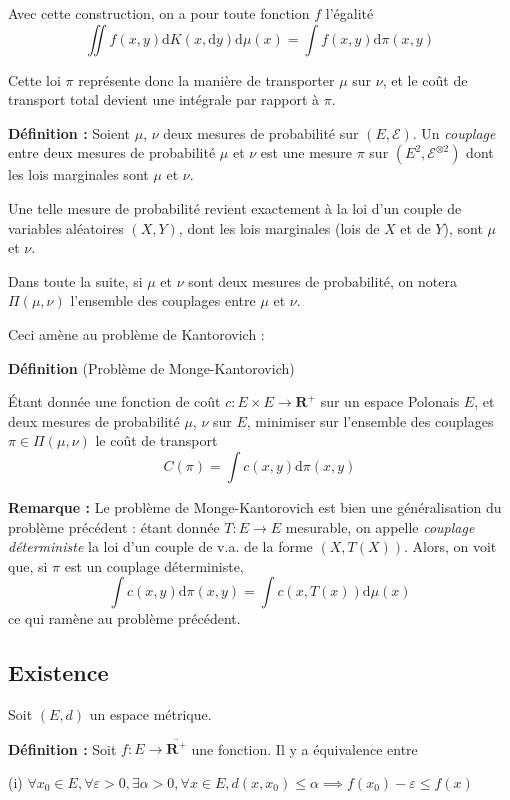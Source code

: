 \documentclass[12pt]{article}
\begin{document}
Avec cette construction, on a pour toute fonction $f$ l'égalité $$ \iint f(x,y) \mathrm d K(x,\mathrm d y) \mathrm d \mu(x) = \int f(x,y) \mathrm d \pi(x,y) $$

Cette loi $ \pi $ représente donc la manière de transporter $ \mu $ sur $\nu$, et le coût de transport total devient une intégrale par rapport à $ \pi $.

\textbf{Définition :} Soient $\mu$, $\nu$ deux mesures de probabilité sur $(E, \mathcal E)$. Un \textit{couplage} entre deux mesures de probabilité $ \mu $ et $ \nu $ est une mesure $ \pi $ sur $ (E^2, \mathcal E^{\otimes 2}) $ dont les lois marginales sont $\mu$ et $\nu$. 

Une telle mesure de probabilité revient exactement à la loi d'un couple de variables aléatoires $ (X,Y) $, dont les lois marginales (lois de $X$ et de $Y$), sont $\mu$ et $\nu$.

Dans toute la suite, si $\mu$ et $\nu $ sont deux mesures de probabilité, on notera $ \Pi(\mu,\nu)$ l'ensemble des couplages entre $\mu$ et $\nu$.

Ceci amène au problème de Kantorovich :

\textbf{Définition} (Problème de Monge-Kantorovich)

Étant donnée une fonction de coût $c : E \times E \to \mathbf R^+ $ sur un espace Polonais $E$, et deux mesures de probabilité $ \mu $, $ \nu $ sur $E$, minimiser sur l'ensemble des couplages $ \pi \in \Pi(\mu,\nu)$ le coût de transport $$ \displaystyle C(\pi) = \int c(x,y) \mathrm d \pi(x,y) $$

\textbf{Remarque :} Le problème de Monge-Kantorovich est bien une généralisation du problème précédent : étant donnée $ T : E \to E $ mesurable, on appelle \textit{couplage déterministe} la loi d'un couple de v.a. de la forme $(X,T(X))$. Alors, on voit que, si $\pi$ est un couplage déterministe, $$ \int c(x,y) \mathrm d \pi(x,y) = \int c(x,T(x)) \mathrm d \mu(x) $$ ce qui ramène au problème précédent.

\subsection{Existence}

Soit $(E,d)$ un espace métrique.

\textbf{Définition :} Soit $ f : E \to \overline{\mathbf R^+} $ une fonction. Il y a équivalence entre

(i) $ \forall x_0 \in E, \forall \varepsilon > 0, \exists \alpha > 0, \forall x \in E, d(x,x_0) \leqslant \alpha \implies f(x_0) - \varepsilon \leqslant f(x) $
\end{document}
